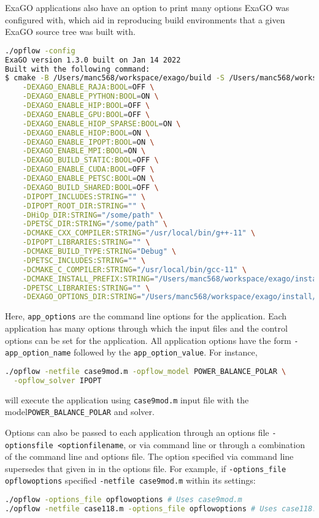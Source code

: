 ExaGO applications also have an option to print many options ExaGO was configured with, which aid in reproducing build environments that a given ExaGO source tree was built with.

\begin{lstlisting}[language=bash]
./opflow -config
ExaGO version 1.3.0 built on Jan 14 2022
Built with the following command:
$ cmake -B /Users/manc568/workspace/exago/build -S /Users/manc568/workspace/exago \
	-DEXAGO_ENABLE_RAJA:BOOL=OFF \
	-DEXAGO_ENABLE_PYTHON:BOOL=ON \
	-DEXAGO_ENABLE_HIP:BOOL=OFF \
	-DEXAGO_ENABLE_GPU:BOOL=OFF \
	-DEXAGO_ENABLE_HIOP_SPARSE:BOOL=ON \
	-DEXAGO_ENABLE_HIOP:BOOL=ON \
	-DEXAGO_ENABLE_IPOPT:BOOL=ON \
	-DEXAGO_ENABLE_MPI:BOOL=ON \
	-DEXAGO_BUILD_STATIC:BOOL=OFF \
	-DEXAGO_ENABLE_CUDA:BOOL=OFF \
	-DEXAGO_ENABLE_PETSC:BOOL=ON \
	-DEXAGO_BUILD_SHARED:BOOL=OFF \
	-DIPOPT_INCLUDES:STRING="" \
	-DIPOPT_ROOT_DIR:STRING="" \
	-DHiOp_DIR:STRING="/some/path" \
	-DPETSC_DIR:STRING="/some/path" \
	-DCMAKE_CXX_COMPILER:STRING="/usr/local/bin/g++-11" \
	-DIPOPT_LIBRARIES:STRING="" \
	-DCMAKE_BUILD_TYPE:STRING="Debug" \
	-DPETSC_INCLUDES:STRING="" \
	-DCMAKE_C_COMPILER:STRING="/usr/local/bin/gcc-11" \
	-DCMAKE_INSTALL_PREFIX:STRING="/Users/manc568/workspace/exago/install" \
	-DPETSC_LIBRARIES:STRING="" \
	-DEXAGO_OPTIONS_DIR:STRING="/Users/manc568/workspace/exago/install/share/exago/options"
\end{lstlisting}

Here, \lstinline{app_options} are the command line options for the application. Each application has many options through which the input files and the control options can be set for the application. All application options have the form \lstinline{-app_option_name} followed by the \lstinline{app_option_value}. 
For instance,
\begin{lstlisting}[language=bash]
  ./opflow -netfile case9mod.m -opflow_model POWER_BALANCE_POLAR \
  -opflow_solver IPOPT
\end{lstlisting}
will execute the \opflow application using \lstinline{case9mod.m} input file
with the model\newline \lstinline{POWER_BALANCE_POLAR} and \ipopt solver.

Options can also be passed to each application through an options file \lstinline{-optionsfile <optionfilename}, or via command line or through a combination of the command line and options file. The option specified via command line supersedes that given in in the options file. For example, if \lstinline{-options_file opflowoptions} specified \lstinline{-netfile case9mod.m} within its settings:
\begin{lstlisting}[language=bash]
./opflow -options_file opflowoptions # Uses case9mod.m
./opflow -netfile case118.m -options_file opflowoptions # Uses case118.m
\end{lstlisting}
